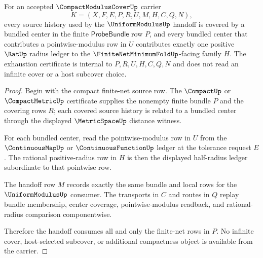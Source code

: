 \begin{theorem}
\label{thm:compact-modulus-cover-finite-net-source-exhaustion}
For an accepted $\CompactModulusCoverUp$ carrier
$$
K=(X,F,E,P,R,U,M,H,C,Q,N),
$$
every source history used by the $\UniformModulusUp$ handoff is covered by a bundled center in the finite $\mathsf{ProbeBundle}$ row $P$, and every bundled center that contributes a pointwise-modulus row in $U$ contributes exactly one positive $\RatUp$ radius ledger to the $\FiniteNetMinimumFoldUp$-facing family $H$. The exhaustion certificate is internal to $P,R,U,H,C,Q,N$ and does not read an infinite cover or a host subcover choice.
\end{theorem}
\begin{proof}
Begin with the compact finite-net source row. The $\CompactUp$ or $\CompactMetricUp$ certificate supplies the nonempty finite bundle $P$ and the covering rows $R$; each covered source history is related to a bundled center through the displayed $\MetricSpaceUp$ distance witness.

For each bundled center, read the pointwise-modulus row in $U$ from the $\ContinuousMapUp$ or $\ContinuousFunctionUp$ ledger at the tolerance request $E$. The rational positive-radius row in $H$ is then the displayed half-radius ledger subordinate to that pointwise row.

The handoff row $M$ records exactly the same bundle and local rows for the $\UniformModulusUp$ consumer. The transports in $C$ and routes in $Q$ replay bundle membership, center coverage, pointwise-modulus readback, and rational-radius comparison componentwise.

Therefore the handoff consumes all and only the finite-net rows in $P$. No infinite cover, host-selected subcover, or additional compactness object is available from the carrier.
\end{proof}

